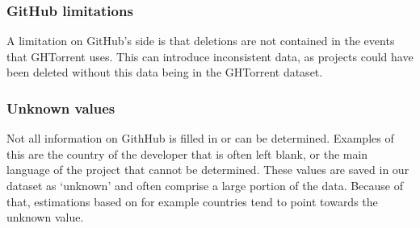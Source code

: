 \subsubsection{GitHub limitations}
A limitation on GitHub's side is that deletions are not contained in the events that GHTorrent uses.\cite{gousios-2013}
This can introduce inconsistent data, as projects could have been deleted without this data being in the GHTorrent dataset.\\

\subsubsection{Unknown values}
Not all information on GithHub is filled in or can be determined.
Examples of this are the country of the developer that is often left blank, or the main language of the project that cannot be determined.
These values are saved in our dataset as `unknown' and often comprise a large portion of the data.
Because of that, estimations based on for example countries tend to point towards the unknown value.
